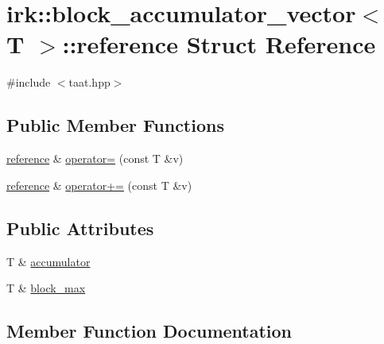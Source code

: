\hypertarget{structirk_1_1block__accumulator__vector_1_1reference}{}\section{irk\+:\+:block\+\_\+accumulator\+\_\+vector$<$ T $>$\+:\+:reference Struct Reference}
\label{structirk_1_1block__accumulator__vector_1_1reference}


{\ttfamily \#include $<$taat.\+hpp$>$}

\subsection*{Public Member Functions}
\begin{DoxyCompactItemize}
\item 
\mbox{\hyperlink{structirk_1_1block__accumulator__vector_1_1reference}{reference}} \& \mbox{\hyperlink{structirk_1_1block__accumulator__vector_1_1reference_aadf6da568b72eb09d89a2fd635f5ac51}{operator=}} (const T \&v)
\item 
\mbox{\hyperlink{structirk_1_1block__accumulator__vector_1_1reference}{reference}} \& \mbox{\hyperlink{structirk_1_1block__accumulator__vector_1_1reference_a1f6bab058cbd0a8c179355ea14f265c8}{operator+=}} (const T \&v)
\end{DoxyCompactItemize}
\subsection*{Public Attributes}
\begin{DoxyCompactItemize}
\item 
T \& \mbox{\hyperlink{structirk_1_1block__accumulator__vector_1_1reference_a4cf080599bee26c43cca95090ee6ca66}{accumulator}}
\item 
T \& \mbox{\hyperlink{structirk_1_1block__accumulator__vector_1_1reference_a39131492f59bc26cf6f8fa28e796f904}{block\+\_\+max}}
\end{DoxyCompactItemize}


\subsection{Member Function Documentation}
\mbox{\label{structirk_1_1block__accumulator__vector_1_1reference_a1f6bab058cbd0a8c179355ea14f265c8}} 
